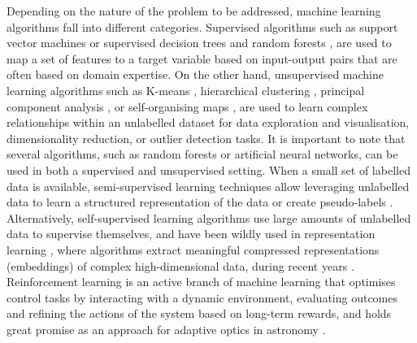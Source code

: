 Depending on the nature of the problem to be addressed, machine learning algorithms fall into different categories. Supervised algorithms such as support vector machines \citep{qu2003,huertas2008,kovacs2015,paschenko2018} or supervised decision trees and random forests \citep{carliles2010,moller2016,ishida2019,bluck2022},  are used to map a set of features to a target variable based on input-output pairs that are often based on domain expertise. On the other hand, unsupervised machine learning algorithms such as K-means \citep{balazs2996,sanchez2010,garcia2018}, hierarchical clustering \citep{hojnacki2007,baron2015,ma2018}, principal component analysis \citep{boroson1992,vandenberk2006,bailey2012}, or self-organising maps \citep{meusinger2012,armstrong2016,rahmani2018}, are used to learn complex relationships within an unlabelled dataset for data exploration and visualisation, dimensionality reduction, or outlier detection tasks. It is important to note that several algorithms, such as random forests or artificial neural networks, can be used in both a supervised and unsupervised setting. When a small set of labelled data is available, semi-supervised learning techniques allow leveraging unlabelled data to learn a structured representation of the data or create pseudo-labels \citep{richards2011,Slijepcevic2022}. Alternatively, self-supervised learning algorithms use large amounts of unlabelled data to supervise themselves, and have been wildly used in representation learning \citep[introduced in astronomy by ][]{serra1993}, where algorithms extract meaningful compressed representations (embeddings) of complex high-dimensional data,  during recent years \citep{Yang2015,hayat2021,sarmiento2021,masbuitrago2024}. Reinforcement learning is an active branch of machine learning that optimises control tasks by interacting with a dynamic environment, evaluating outcomes and refining the actions of the system based on long-term rewards, and holds great promise as an approach for adaptive optics in astronomy \citep{Nousiainen2021,nousiainen2022,gutierrez2024}.

